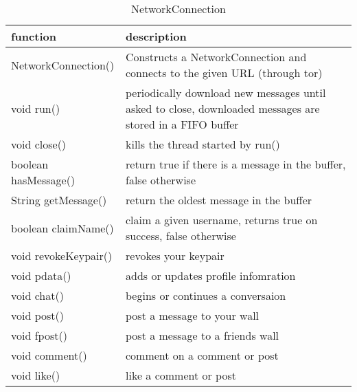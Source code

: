 \begin{table}[h]
    \centering
    \begin{tabular}{p{3.6cm}p{9cm}}
    function             & description\\ \hline
    NetworkConnection()  & Constructs a NetworkConnection and connects to the given URL (through tor)\\
    void run()           & periodically download new messages until asked to close, downloaded messages are stored in a FIFO buffer\\
    void close()         & kills the thread started by run()\\
    boolean hasMessage() & return true if there is a message in the buffer, false otherwise\\
    String getMessage()  & return the oldest message in the buffer\\
    
    boolean claimName()  & claim a given username, returns true on success, false otherwise\\
    void revokeKeypair() & revokes your keypair\\
    void pdata()         & adds or updates profile infomration\\
    void chat()          & begins or continues a conversaion\\
    void post()          & post a message to your wall\\
    void fpost()         & post a message to a friends wall\\
    void comment()       & comment on a comment or post\\
    void like()          & like a comment or post\\
    \end{tabular}
    \caption{NetworkConnection}
\end{table}

